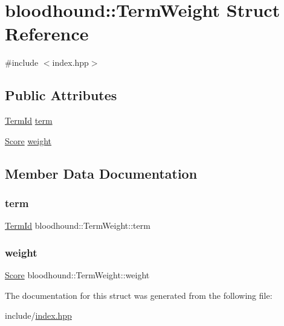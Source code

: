 \hypertarget{structbloodhound_1_1TermWeight}{}\section{bloodhound\+:\+:Term\+Weight Struct Reference}
\label{structbloodhound_1_1TermWeight}


{\ttfamily \#include $<$index.\+hpp$>$}

\subsection*{Public Attributes}
\begin{DoxyCompactItemize}
\item 
\mbox{\hyperlink{structbloodhound_1_1TermId}{Term\+Id}} \mbox{\hyperlink{structbloodhound_1_1TermWeight_a8606421116b89015b89272bd5e2602a9}{term}}
\item 
\mbox{\hyperlink{structbloodhound_1_1Score}{Score}} \mbox{\hyperlink{structbloodhound_1_1TermWeight_a1abc2c53928fbaa8dcf617e72e1afced}{weight}}
\end{DoxyCompactItemize}


\subsection{Member Data Documentation}
\mbox{\label{structbloodhound_1_1TermWeight_a8606421116b89015b89272bd5e2602a9}} 
\subsubsection{\texorpdfstring{term}{term}}
{\footnotesize\ttfamily \mbox{\hyperlink{structbloodhound_1_1TermId}{Term\+Id}} bloodhound\+::\+Term\+Weight\+::term}

\mbox{\label{structbloodhound_1_1TermWeight_a1abc2c53928fbaa8dcf617e72e1afced}} 
\subsubsection{\texorpdfstring{weight}{weight}}
{\footnotesize\ttfamily \mbox{\hyperlink{structbloodhound_1_1Score}{Score}} bloodhound\+::\+Term\+Weight\+::weight}



The documentation for this struct was generated from the following file\+:\begin{DoxyCompactItemize}
\item 
include/\mbox{\hyperlink{index_8hpp}{index.\+hpp}}\end{DoxyCompactItemize}
